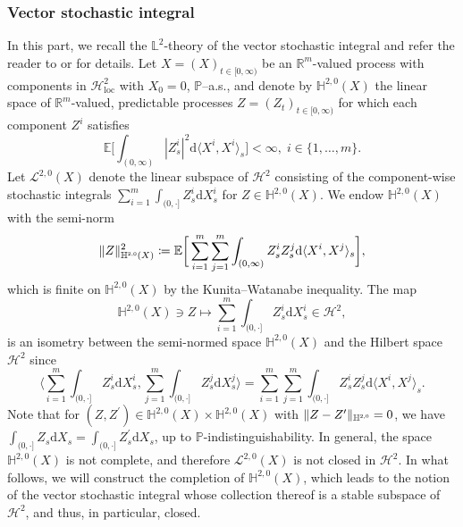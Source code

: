 \documentclass[10pt]{article} %
\newcommand\cH{\mathcal H}
\newcommand\cL{\mathcal L}
\newcommand{\smalltext}[1]{\text{\fontsize{4}{4}\selectfont$#1$}}
\def \E{\mathbb{E}}
\def \H{\mathbb{H}}
\def \L{\mathbb{L}}
\def \P{\mathbb{P}}
\def \R{\mathbb{R}}
\newcommand{\1}{\mathbf{1}}
\def\d{\mathrm{d}}
\begin{document}
\subsubsection{Vector stochastic integral}\label{sec::vector_si}

In this part, we recall the $\L^2$-theory of the vector stochastic integral and refer the reader to \cite[Section III.6]{jacod2003limit} or \cite[Section IV.2]{jacod1979calcul} for details. Let $X = (X)_{t \in [0,\infty)}$ be an $\R^m$-valued process with components in $\cH^2_\mathrm{loc}$ with $X_0 = 0$, $\P$--a.s., and denote by $\H^{2,0}(X)$ the linear space of $\R^m$-valued, predictable processes $Z=(Z_t)_{t \in [0,\infty)}$ for which each component $Z^i$ satisfies
\begin{equation*}
	\E\bigg[ \int_{(0,\infty)} |Z^i_s|^2 \d \langle X^i, X^i \rangle_s\bigg] < \infty,\; i\in\{1,\dots,m\}.
\end{equation*}
Let $\cL^{2,0}(X)$ denote the linear subspace of $\cH^2$ consisting of the component-wise stochastic integrals $\sum_{i = 1}^m \int_{(0,\cdot]} Z^i_s \d X^i_s$ for $Z \in \H^{2,0}(X)$. We endow $\H^{2,0}(X)$ with the semi-norm
\begin{equation*}
	\|Z\|^2_{\H^{\smalltext{2}\smalltext{,}\smalltext{0}}(X)} \coloneqq \E \bigg[ \sum_{i= 1}^m\sum_{j=1}^m \int_{(0,\infty)} Z^i_s Z^j_s \d \langle X^i,X^j \rangle_s \bigg],
\end{equation*}
which is finite on $\H^{2,0}(X)$ by the Kunita--Watanabe inequality. The map
\begin{equation}\label{eq::isometry}
	\H^{2,0}(X) \ni Z \longmapsto \sum_{i = 1}^m \int_{(0,\cdot]} Z^i_s \d X^i_s \in \cH^2,
\end{equation}
is an isometry between the semi-normed space $\H^{2,0}(X)$ and the Hilbert space $\cH^2$ since
\begin{equation*}
	\bigg\langle \sum_{i = 1}^m \int_{(0,\cdot]} Z^i_s \d X^i_s, \sum_{j = 1}^m \int_{(0,\cdot]} Z^j_s \d X^j_s \bigg\rangle = \sum_{i=1}^m\sum_{j=1}^m \int_{(0,\cdot]} Z^i_s Z^j_s \d \langle X^i, X^j \rangle_s.
\end{equation*}
Note that for $(Z,Z^\prime) \in \H^{2,0}(X) \times \H^{2,0}(X)$ with $\|Z-Z^\prime\|_{\H^{\smalltext{2}\smalltext{,}\smalltext{0}}}=0$, we have $\int_{(0,\cdot]} Z_s \d X_s = \int_{(0,\cdot]} Z^\prime_s \d X_s$, up to $\P$-indistinguishability. In general, the space $\H^{2,0}(X)$ is not complete, and therefore $\cL^{2,0}(X)$ is not closed in $\cH^2$. In what follows, we will construct the completion of $\H^{2,0}(X)$, which leads to the notion of the vector stochastic integral whose collection thereof is a stable subspace of $\cH^2$, and thus, in particular, closed.
\end{document}
